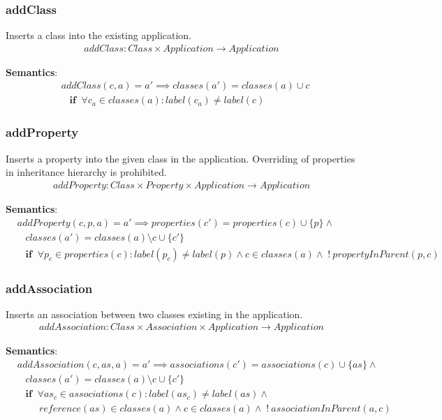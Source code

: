\documentclass[10pt]{article}
\begin{document}
\subsubsection{addClass}
Inserts a class into the existing application.
\begin{align}
addClass: Class \times Application \rightarrow Application
\end{align}

\noindent \textbf{Semantics}:
\begin{align}
& addClass(c, a) = a' \implies classes(a') = classes(a) \cup c \nonumber \\
& \;\;\; \mathbf{if} \;\; \forall c_a \in classes(a): label(c_a) \neq label(c)
\end{align}

\subsubsection{addProperty}
Inserts a property into the given class in the application. Overriding of properties in inheritance hierarchy is prohibited.
\begin{align}
addProperty: Class \times Property \times Application \rightarrow Application 
\end{align}

\noindent \textbf{Semantics}:
\begin{align}
& addProperty(c, p, a) = a' \implies properties(c') = properties(c) \cup \{ p \}  \land \nonumber \\
& \;\;\; classes(a') = classes(a) \setminus c  \cup \{c'\}  \nonumber \\
& \;\;\; \mathbf{if} \;\; \forall p_c \in properties(c) : label(p_c) \neq label(p) \land c \in classes(a) \land \; !\:propertyInParent(p, c)
\end{align}

\subsubsection{addAssociation}
Inserts an association between two classes existing in the application.
\begin{align}
addAssociation: Class \times Association  \times Application \rightarrow Application
\end{align}

\noindent \textbf{Semantics}:
\begin{align}
& addAssociation(c, as, a) = a' \implies associations(c') = associations(c) \cup \{ as \}  \land \nonumber \\
& \;\;\; classes(a') = classes(a) \setminus c  \cup \{c'\}  \nonumber \\
& \;\;\; \mathbf{if} \;\; \forall as_c \in associations(c) : label(as_c) \neq label(as) \land \nonumber \\
& \;\;\;\;\;\;\;\; reference(as) \in classes(a) \land c \in classes(a) \land \; !\: associationInParent(a, c)
\end{align}
\end{document}
